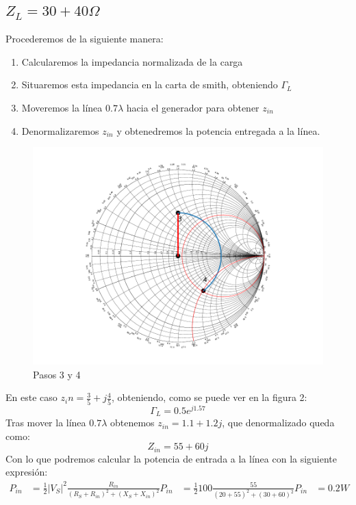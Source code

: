 \subsection{$Z_L = 30 + 40 \Omega$}
Procederemos de la siguiente manera:
\begin{enumerate}
  \item Calcularemos la impedancia normalizada de la carga
  \item Situaremos esta impedancia en la carta de smith, obteniendo $\Gamma_L$
  \item Moveremos la línea $0.7\lambda$ hacia el generador para obtener $z_{in}$
  \item Denormalizaremos $z_{in}$ y obtenedremos la potencia entregada a la línea.
\end{enumerate}

\begin{figure}[h]
  \centering
  \includegraphics[scale = 0.85]{ej6/images/out1.pdf}
  \caption{Pasos 3 y 4}
  \label{ej2smith}
\end{figure}

En este caso $z_in = \frac{3}{5} + j\frac{4}{5}$, obteniendo, como se puede ver en la figura 2:
\[ \Gamma_L = 0.5e^{j1.57} \]
Tras mover la línea $0.7\lambda$ obtenemos $z_{in} = 1.1 + 1.2j$, que denormalizado queda como:
\[Z_{in} = 55 + 60j\]
 Con lo que podremos calcular la potencia de entrada a la línea con la siguiente expresión:
\begin{align*}
  P_{in} &= \frac{1}{2}|V_S|^2 \frac{R_{in}}{(R_S + R_{in} )^2 + (X_S + X_{in})^2}
  P_{in} &= \frac{1}{2}100  \frac{55}{(20+55)^2 + (30+60)^2}
  P_{in} &= 0.2 W
\end{align*}

